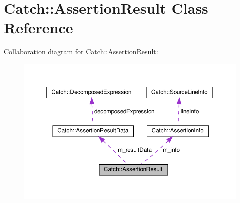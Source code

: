 \hypertarget{classCatch_1_1AssertionResult}{}\section{Catch\+:\+:Assertion\+Result Class Reference}
\label{classCatch_1_1AssertionResult}


Collaboration diagram for Catch\+:\+:Assertion\+Result\+:
\nopagebreak
\begin{figure}[H]
\begin{center}
\leavevmode
\includegraphics[width=350pt]{classCatch_1_1AssertionResult__coll__graph}
\end{center}
\end{figure}
